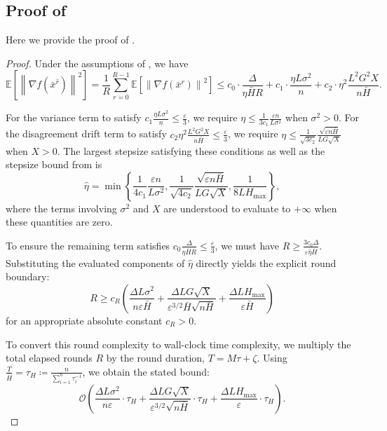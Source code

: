 \documentclass{article}
\newcommand{\norm}[1]{{\left\| #1 \right\|}}
\newcommand{\rbr}[1]{\left(#1\right)} %
\newcommand{\nbr}[1]{\left\{#1\right\}} %
\newcommand{\Exp}[1]{{\mathbb{E}} \left[ #1 \right]}
\theoremstyle{plain}
\theoremstyle{definition}
\begin{document}
\subsection{Proof of }\label{proof:time_complexity}
% 
Here we provide the proof of .
\begin{proof}
Under the assumptions of , we have
\begin{equation*}
        \Exp{\norm{\nabla f(\bar x^{\hat{r}})}^2} = \frac{1}{R} \sum_{r=0}^{R-1} \Exp{\norm{\nabla f(\bar x^r)}^2} \le c_0 \cdot \frac{\Delta}{\eta \bar H R} + c_1 \cdot \frac{\eta L \sigma^2}{n} + c_2 \cdot \eta^2 \frac{L^2 G^2 X}{n \bar H} .
\end{equation*}

For the variance term to satisfy $c_1 \frac{\eta L \sigma^2}{n} \le \frac{\varepsilon}{3}$, we require $\eta \le \frac{1}{3 c_1} \frac{\varepsilon n}{L \sigma^2}$ when $\sigma^2 > 0$. 
For the disagreement drift term to satisfy $c_2 \eta^2 \frac{L^2 G^2 X}{n \bar H} \le \frac{\varepsilon}{3}$, we require $\eta \le \frac{1}{\sqrt{3 c_2}} \frac{\sqrt{\varepsilon n \bar H}}{L G \sqrt{X}}$ when $X > 0$.
The largest stepsize satisfying these conditions as well as the stepsize bound from  is
\begin{equation*}
    \hat\eta = \min\nbr{\frac{1}{4 c_1} \frac{\varepsilon n}{L \sigma^2}, \frac{1}{\sqrt{4 c_2}} \frac{\sqrt{\varepsilon n \bar H}}{L G \sqrt{X}}, \frac{1}{8 L H_{\max}}},
\end{equation*}
where the terms involving $\sigma^2$ and $X$ are understood to evaluate to $+ \infty$ when these quantities are zero.

To ensure the remaining term satisfies $c_0 \frac{\Delta}{\eta \bar H R} \le \frac{\varepsilon}{3}$, we must have $R \ge \frac{3 c_0 \Delta}{\varepsilon \hat\eta \bar H}$. 
Substituting the evaluated components of $\hat\eta$ directly yields the explicit round boundary:
\begin{equation*}
    R \ge c_R \left( \frac{\Delta L \sigma^2}{n \varepsilon \bar H} + \frac{\Delta L G \sqrt{X}}{\varepsilon^{3/2} \bar H \sqrt{n \bar H}} + \frac{\Delta L H_{\max}}{\varepsilon \bar H} \right)
\end{equation*}
for an appropriate absolute constant $c_R > 0$.

To convert this round complexity to wall-clock time complexity, we multiply the total elapsed rounds $R$ by the round duration, $T = M \tau + \zeta$. 
Using $\frac{T}{\bar H} = \tau_H \coloneqq \frac{n}{\sum_{i=1}^n \tau_i^{-1}}$, we obtain the stated bound:
\begin{equation*}
    \mathcal{O}\rbr{\frac{\Delta L \sigma^2}{n \varepsilon} \cdot \tau_H + \frac{\Delta L G \sqrt{X}}{\varepsilon^{3/2} \sqrt{n \bar H}} \cdot \tau_H + \frac{\Delta L H_{\max}}{\varepsilon} \cdot \tau_H}.
\end{equation*}
\end{proof}
% 
\end{document}
